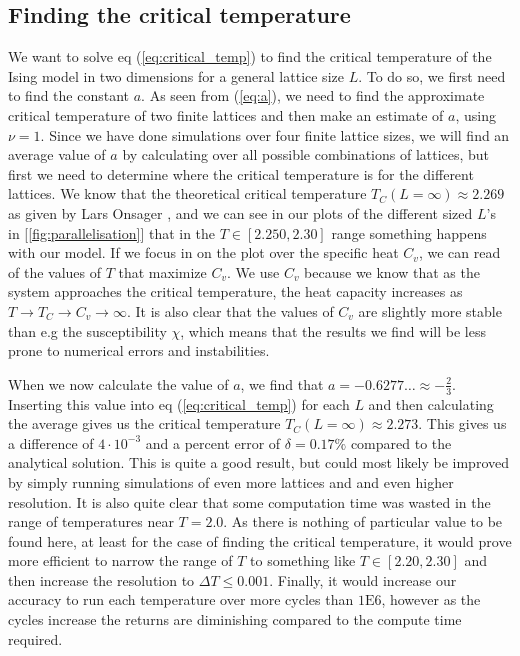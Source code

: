 \documentclass[../main.tex]{subfiles}
\begin{document}
\subsection{Finding the critical temperature}
We want to solve eq (\ref{eq:critical_temp}) to find the critical temperature of the Ising model in two dimensions for a general lattice size $L$. To do so, we first need to find the constant $a$. As seen from (\ref{eq:a}), we need to find the approximate critical temperature of two finite lattices and then make an estimate of $a$, using $\nu = 1$. Since we have done simulations over four finite lattice sizes, we will find an average value of $a$ by calculating over all possible combinations of lattices, but first we need to determine where the critical temperature is for the different lattices. We know that the theoretical critical temperature $T_C(L = \infty) \approx 2.269$ as given by Lars Onsager \cite{Onsager1944}, and we can see in our plots of the different sized $L$'s in [\ref{fig:parallelisation}] that in the $T \in [2.250, 2.30]$ range something happens with our model. If we focus in on the plot over the specific heat $C_v$, we can read of the values of $T$ that maximize $C_v$. We use $C_v$ because we know that as the system approaches the critical temperature, the heat capacity increases as $T \rightarrow T_C \rightarrow C_v \rightarrow \infty$. It is also clear that the values of $C_v$ are slightly more stable than e.g the susceptibility $\chi$, which means that the results we find will be less prone to numerical errors and instabilities. 

When we now calculate the value of $a$, we find that $a = -0.6277 \hdots \approx -\frac{2}{3}$. Inserting this value into eq (\ref{eq:critical_temp}) for each $L$ and then calculating the average gives us the critical temperature $T_C(L = \infty) \approx 2.273$. This gives us a difference of $4 \cdot 10^{-3}$ and a percent error of $\delta = 0.17\%$ compared to the analytical solution. This is quite a good result, but could most likely be improved by simply running simulations of even more lattices and and even higher resolution. It is also quite clear that some computation time was wasted in the range of temperatures near $T = 2.0$. As there is nothing of particular value to be found here, at least for the case of finding the critical temperature, it would prove more efficient to narrow the range of $T$ to something like $T \in [2.20, 2.30]$ and then increase the resolution to $\Delta T \leq 0.001$. Finally, it would increase our accuracy to run each temperature over more cycles than $1\text{E}6$, however as the cycles increase the returns are diminishing compared to the compute time required.
\end{document}
